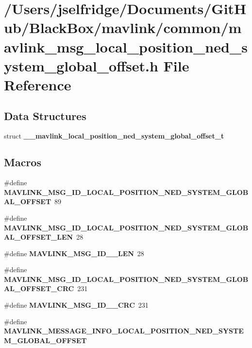 \section{/\+Users/jselfridge/\+Documents/\+Git\+Hub/\+Black\+Box/mavlink/common/mavlink\+\_\+msg\+\_\+local\+\_\+position\+\_\+ned\+\_\+system\+\_\+global\+\_\+offset.h File Reference}
\label{mavlink__msg__local__position__ned__system__global__offset_8h}
\subsection*{Data Structures}
\begin{DoxyCompactItemize}
\item 
struct \textbf{ \+\_\+\+\_\+mavlink\+\_\+local\+\_\+position\+\_\+ned\+\_\+system\+\_\+global\+\_\+offset\+\_\+t}
\end{DoxyCompactItemize}
\subsection*{Macros}
\begin{DoxyCompactItemize}
\item 
\#define \textbf{ M\+A\+V\+L\+I\+N\+K\+\_\+\+M\+S\+G\+\_\+\+I\+D\+\_\+\+L\+O\+C\+A\+L\+\_\+\+P\+O\+S\+I\+T\+I\+O\+N\+\_\+\+N\+E\+D\+\_\+\+S\+Y\+S\+T\+E\+M\+\_\+\+G\+L\+O\+B\+A\+L\+\_\+\+O\+F\+F\+S\+ET}~89
\item 
\#define \textbf{ M\+A\+V\+L\+I\+N\+K\+\_\+\+M\+S\+G\+\_\+\+I\+D\+\_\+\+L\+O\+C\+A\+L\+\_\+\+P\+O\+S\+I\+T\+I\+O\+N\+\_\+\+N\+E\+D\+\_\+\+S\+Y\+S\+T\+E\+M\+\_\+\+G\+L\+O\+B\+A\+L\+\_\+\+O\+F\+F\+S\+E\+T\+\_\+\+L\+EN}~28
\item 
\#define \textbf{ M\+A\+V\+L\+I\+N\+K\+\_\+\+M\+S\+G\+\_\+\+I\+D\+\_\+\_\+\+L\+EN}~28
\item 
\#define \textbf{ M\+A\+V\+L\+I\+N\+K\+\_\+\+M\+S\+G\+\_\+\+I\+D\+\_\+\+L\+O\+C\+A\+L\+\_\+\+P\+O\+S\+I\+T\+I\+O\+N\+\_\+\+N\+E\+D\+\_\+\+S\+Y\+S\+T\+E\+M\+\_\+\+G\+L\+O\+B\+A\+L\+\_\+\+O\+F\+F\+S\+E\+T\+\_\+\+C\+RC}~231
\item 
\#define \textbf{ M\+A\+V\+L\+I\+N\+K\+\_\+\+M\+S\+G\+\_\+\+I\+D\+\_\+\_\+\+C\+RC}~231
\item 
\#define \textbf{ M\+A\+V\+L\+I\+N\+K\+\_\+\+M\+E\+S\+S\+A\+G\+E\+\_\+\+I\+N\+F\+O\+\_\+\+L\+O\+C\+A\+L\+\_\+\+P\+O\+S\+I\+T\+I\+O\+N\+\_\+\+N\+E\+D\+\_\+\+S\+Y\+S\+T\+E\+M\+\_\+\+G\+L\+O\+B\+A\+L\+\_\+\+O\+F\+F\+S\+ET}
\end{DoxyCompactItemize}
